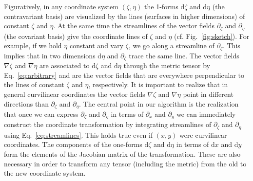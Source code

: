 \documentclass{hitec} %
\renewcommand{\d}{\mathrm{d}}
\begin{document}
Figuratively, in any coordinate system $(\zeta,\eta)$ the 1-forms $\d \zeta$ and $\d \eta$ (the contravariant basis) are visualized by the lines (surfaces in higher dimensions) 
of constant $\zeta$ and $\eta$. 
At the same time the streamlines of the vector fields $\partial_\zeta$ and $\partial_\eta$ (the covariant basis) 
give the coordinate lines of $\zeta$ and $\eta$ (cf. Fig.~\ref{fig:sketch}). 
For example, if we hold $\eta$ constant and vary $\zeta$, we go along a streamline of 
$\partial_\zeta$. This implies that in two dimensions $\d \eta$ and $\partial_\zeta$ 
trace the same line. The vector fields $\nabla \zeta$ and $\nabla \eta$ are associated to 
$\d \zeta$ and $\d \eta$ through the metric tensor by Eq.~\eqref{eq:arbitrary} and are the vector fields that
are everywhere perpendicular to the lines of constant $\zeta$ and $\eta$, respectively. 
It is important to realize that in general curvilinear coordinates the vector
fields $\nabla \zeta$ and $\nabla \eta$ point in 
different directions than $\partial_\zeta$ and $\partial_\eta$.
The central point in our algorithm is the realization that once we can 
express $\partial_\zeta$ and $\partial_\eta$ in terms of $\partial_x$ and 
$\partial_y$ we can immediately construct the coordinate transformation 
by integrating 
streamlines of $\partial_\zeta$ and $\partial_\eta$ using Eq.~\eqref{eq:streamlines}. This 
holds true even if $(x,y)$ were curvilinear coordinates. The components of the 
one-forms $\d \zeta$ and $\d\eta$ in terms of $\d x$ and $\d y$ form 
the elements of the Jacobian matrix of the transformation. These 
are also necessary in order to transform any tensor (including the metric) 
from the old to the new coordinate system. 
\end{document}
